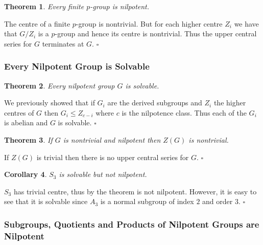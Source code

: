 \documentclass[10pt]{article}
\newtheorem{theorem}{Theorem}[section]
\newtheorem{corollary}[theorem]{Corollary}
\newenvironment{proof}[1][Proof]{\begin{trivlist}
\item[\hskip \labelsep {\itshape #1}]}{\end{trivlist}}
\begin{document}
\begin{theorem}
Every finite $p$-group is nilpotent.
\end{theorem}

\begin{proof}
The centre of a finite $p$-group is nontrivial. But for each higher centre $Z_i$ we have that $G/Z_i$ is a $p$-group and hence its centre is nontrivial. Thus the upper central series for $G$ terminates at $G$. $\square$
\end{proof}

\subsubsection{Every Nilpotent Group is Solvable}

\begin{theorem}
Every nilpotent group $G$ is solvable.
\end{theorem}

\begin{proof}
We previously showed that if $G_i$ are the derived subgroups and $Z_i$ the higher centres of $G$ then $G_i \leq Z_{c-i}$ where $c$ is the nilpotence class. Thus each of the $G_i$ is abelian and $G$ is solvable. $\square$
\end{proof}

\begin{theorem}
If $G$ is nontrivial and nilpotent then $Z(G)$ is nontrivial.
\end{theorem}

\begin{proof}
If $Z(G)$ is trivial then there is no upper central series for $G$. $\square$
\end{proof}

\begin{corollary}
$S_3$ is solvable but not nilpotent.
\end{corollary}

\begin{proof}
$S_3$ has trivial centre, thus by the theorem is not nilpotent. However, it is easy to see that it is solvable since $A_3$ is a normal subgroup of index $2$ and order $3$. $\square$
\end{proof}

\subsubsection{Subgroups, Quotients and Products of Nilpotent Groups are Nilpotent}
\end{document}
